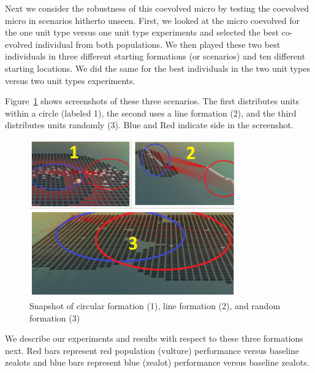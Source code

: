 \documentclass[conference,10pt]{IEEEtran}
\begin{document}

Next we consider the robustness of this coevolved micro by testing the
coevolved micro in scenarios hitherto unseen. First, we looked at the
micro coevolved for the one unit type versus one unit type experiments
and selected the best co-evolved individual from both populations. We
then played these two best individuals in three different starting
formations (or scenarios) and ten different starting locations. We did the same for
the best individuals in the two unit types versus two unit types
experiments.

Figure~\ref{formations} shows screenshots of these three scenarios. The first distributes units within a circle (labeled 1), the second uses a line formation (2), and the third distributes units randomly (3). Blue and Red indicate side in the screenshot.
\begin{figure}
    \centerline{ \includegraphics[width=3.5in]{scenarios.png} }
    \caption{Snapshot of circular formation (1), line formation (2), and random formation (3)}
    \label{formations}
\end{figure}
We describe our experiments and results with respect to these three
formations next. Red bars represent red population (vulture)
performance versus baseline zealots and blue bars represent blue
(zealot) performance versus baseline zealots.
\end{document}
